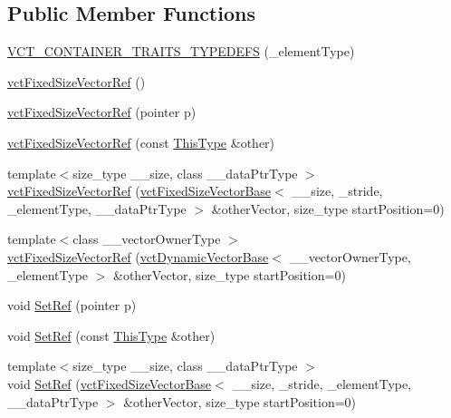 \subsection*{Public Member Functions}
\begin{DoxyCompactItemize}
\item 
\hyperlink{classvct_fixed_size_vector_ref_a7a66fa8ab6598a28feabe1c86c2f93f9}{V\-C\-T\-\_\-\-C\-O\-N\-T\-A\-I\-N\-E\-R\-\_\-\-T\-R\-A\-I\-T\-S\-\_\-\-T\-Y\-P\-E\-D\-E\-F\-S} (\-\_\-element\-Type)
\item 
\hyperlink{classvct_fixed_size_vector_ref_a543ec7356fcb875f9242700d1928316c}{vct\-Fixed\-Size\-Vector\-Ref} ()
\item 
\hyperlink{classvct_fixed_size_vector_ref_a1fe5202cf31d82049b657f40a3d2caab}{vct\-Fixed\-Size\-Vector\-Ref} (pointer p)
\item 
\hyperlink{classvct_fixed_size_vector_ref_a7434262bdfeea16951f333d9e07113bf}{vct\-Fixed\-Size\-Vector\-Ref} (const \hyperlink{classvct_fixed_size_vector_ref_a3fc8fbdfc7492a38119e7ed7ef5bc289}{This\-Type} \&other)
\item 
{\footnotesize template$<$size\-\_\-type \-\_\-\-\_\-size, class \-\_\-\-\_\-data\-Ptr\-Type $>$ }\\\hyperlink{classvct_fixed_size_vector_ref_abb6cd735a90720681998fd60e78ac6c7}{vct\-Fixed\-Size\-Vector\-Ref} (\hyperlink{classvct_fixed_size_vector_base}{vct\-Fixed\-Size\-Vector\-Base}$<$ \-\_\-\-\_\-size, \-\_\-stride, \-\_\-element\-Type, \-\_\-\-\_\-data\-Ptr\-Type $>$ \&other\-Vector, size\-\_\-type start\-Position=0)
\item 
{\footnotesize template$<$class \-\_\-\-\_\-vector\-Owner\-Type $>$ }\\\hyperlink{classvct_fixed_size_vector_ref_a3d3b0af3edc9d03a70f0df8660117253}{vct\-Fixed\-Size\-Vector\-Ref} (\hyperlink{classvct_dynamic_vector_base}{vct\-Dynamic\-Vector\-Base}$<$ \-\_\-\-\_\-vector\-Owner\-Type, \-\_\-element\-Type $>$ \&other\-Vector, size\-\_\-type start\-Position=0)
\item 
void \hyperlink{classvct_fixed_size_vector_ref_a08bc25aaca173af6a6fbdecd140edbe0}{Set\-Ref} (pointer p)
\item 
void \hyperlink{classvct_fixed_size_vector_ref_a7e79c21f80dbd4137ddfb33ab9c55ecd}{Set\-Ref} (const \hyperlink{classvct_fixed_size_vector_ref_a3fc8fbdfc7492a38119e7ed7ef5bc289}{This\-Type} \&other)
\item 
{\footnotesize template$<$size\-\_\-type \-\_\-\-\_\-size, class \-\_\-\-\_\-data\-Ptr\-Type $>$ }\\void \hyperlink{classvct_fixed_size_vector_ref_a9db29d2d3e4138d144d973224dcb2c39}{Set\-Ref} (\hyperlink{classvct_fixed_size_vector_base}{vct\-Fixed\-Size\-Vector\-Base}$<$ \-\_\-\-\_\-size, \-\_\-stride, \-\_\-element\-Type, \-\_\-\-\_\-data\-Ptr\-Type $>$ \&other\-Vector, size\-\_\-type start\-Position=0)

\end{DoxyCompactItemize}
